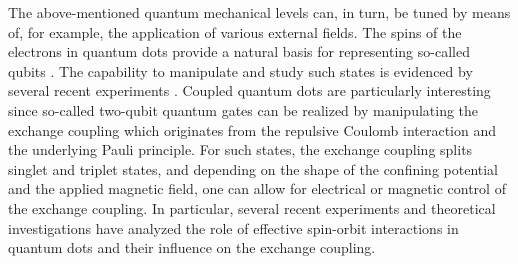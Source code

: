 \documentclass[twocolumn]{revtex4}
\begin{document}
The above-mentioned quantum mechanical levels can, in turn, be tuned
by means of, for example, the application of various external fields.
The spins of the electrons in quantum dots provide a natural basis for
representing so-called qubits \cite{divincenzo1996}. The capability to
manipulate and study such states is evidenced by several recent
experiments \cite{exp1,exp2}.  Coupled quantum dots are particularly
interesting since so-called two-qubit quantum gates can be realized by
manipulating the exchange coupling which originates from the repulsive
Coulomb interaction and the underlying Pauli principle.  For such
states, the exchange coupling splits singlet and triplet states, and
depending on the shape of the confining potential and the applied
magnetic field, one can allow for electrical or magnetic control of
the exchange coupling. In particular, several recent experiments and
theoretical investigations have analyzed the role of effective
spin-orbit interactions in quantum dots
\cite{exp5,exp6,pederiva2010,spinorbit} and their influence on the
exchange coupling.
\end{document}
